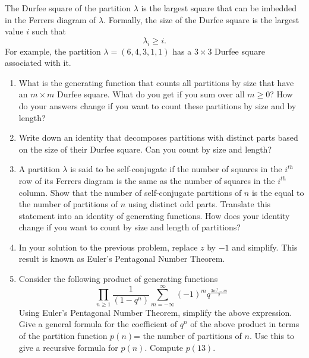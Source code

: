 \documentclass[10pt]{article}
\newcounter{lastexercise}
\newenvironment{exercises}
  {\begin{enumerate}
    \setcounter{enumi}\thelastexercise}
{\setcounter{lastexercise}\theenumi\end{enumerate}}
\begin{document}
The Durfee square of the partition $\lambda$ is the largest square that can be imbedded in the Ferrers diagram of $\lambda$.  Formally, the size of the Durfee square is the largest value $i$ such that 
$$\lambda_{i}\geq i.$$
For example, the partition $\lambda = (6,4,3,1,1)$ has a $3\times 3$ Durfee square associated with it.

\begin{exercises}
\item What is the generating function that counts all partitions by size that have an $m \times m$ Durfee square.  What do you get if you sum over all $m\geq 0$?  How do your answers change if you want to count these partitions by size and by length?

\item Write down an identity that decomposes partitions with distinct parts based on the size of their Durfee square.  Can you count by size and length?

\item A partition $\lambda$ is said to be self-conjugate if the number of squares in the $i^{th}$ row of its Ferrers diagram is the same as the number of squares in the $i^{th}$ column.  Show that the number of self-conjugate partitions of $n$ is the equal to the number of partitions of $n$ using distinct odd parts.  Translate this statement into an identity of generating functions.  How does your identity change if you want to count by size and length of partitions?


\item In your solution to the previous problem, replace $z$ by $-1$ and simplify.  This result is known as Euler's Pentagonal Number Theorem.

\item Consider the following product of generating functions
$$\prod_{n\geq 1} \frac{1}{(1-q^n)}\sum_{m=-\infty}^{\infty} (-1)^m q^{\frac{3m^2-m}{2}}$$
Using Euler's Pentagonal Number Theorem, simplify the above expression.  Give a general formula for the coefficient of $q^{n}$ of the above product in terms of the partition function $p(n)$= the number of partitions of $n$.  Use this to give a recursive formula for $p(n)$.  Compute $p(13)$.

\end{exercises}
\end{document}
